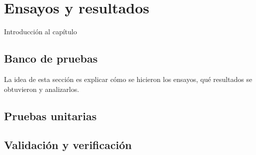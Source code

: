 
\chapter{Ensayos y resultados} %

\label{Chapter4} %


Introducción al capítulo

\section{Banco de pruebas}
\label{sec:bancoPruebas}

La idea de esta sección es explicar cómo se hicieron los ensayos, qué resultados se obtuvieron y analizarlos.

\section{Pruebas unitarias}
\label{sec:pruebasUnitarias}

\section{Validación y verificación}
\label{sec:validacionVerificacion}